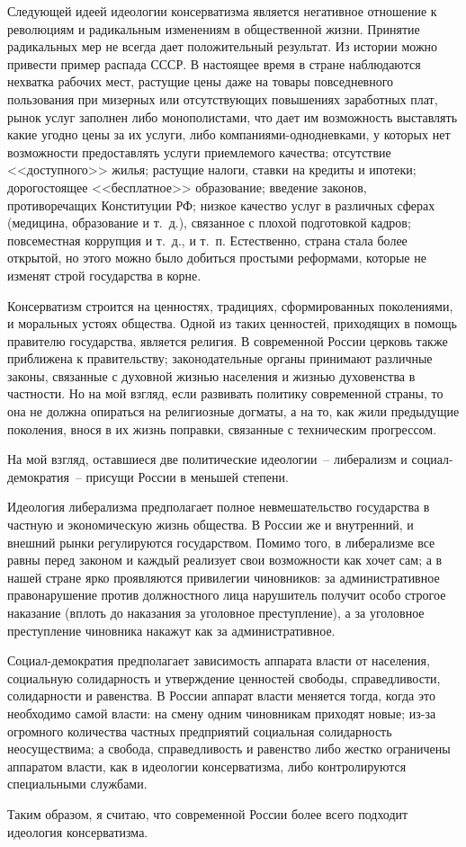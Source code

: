 \documentclass[pscyr]{hedreport}
\begin{document}
  Следующей идеей идеологии консерватизма является негативное отношение к
  революциям и радикальным изменениям в общественной жизни. Принятие радикальных
  мер не всегда дает положительный результат. Из истории можно привести пример
  распада СССР. В настоящее время в стране наблюдаются нехватка рабочих мест,
  растущие цены даже на товары повседневного пользования при мизерных или
  отсутствующих повышениях заработных плат, рынок услуг заполнен либо
  монополистами, что дает им возможность выставлять какие угодно цены за их
  услуги, либо компаниями-однодневками, у которых нет возможности предоставлять
  услуги приемлемого качества; отсутствие <<доступного>> жилья; растущие налоги,
  ставки на кредиты и ипотеки; дорогостоящее <<бесплатное>> образование;
  введение законов, противоречащих Конституции РФ; низкое качество услуг в
  различных сферах (медицина, образование и т.~д.), связанное с плохой
  подготовкой кадров; повсеместная коррупция и т.~д., и т.~п. Естественно,
  страна стала более открытой, но этого можно было добиться простыми реформами,
  которые не изменят строй государства в корне.

  Консерватизм строится на ценностях, традициях, сформированных поколениями, и
  моральных устоях общества. Одной из таких ценностей, приходящих в помощь
  правителю государства, является религия. В современной России церковь также
  приближена к правительству; законодательные органы принимают различные законы,
  связанные с духовной жизнью населения и жизнью духовенства в частности. Но на
  мой взгляд, если развивать политику современной страны, то она не должна
  опираться на религиозные догматы, а на то, как жили предыдущие поколения,
  внося в их жизнь поправки, связанные с техническим прогрессом.

  На мой взгляд, оставшиеся две политические идеологии~-- либерализм и
  социал-демократия~-- присущи России в меньшей степени.

  Идеология либерализма предполагает полное невмешательство государства в
  частную и экономическую жизнь общества. В России же и внутренний, и внешний
  рынки регулируются государством. Помимо того, в либерализме все равны перед
  законом и каждый реализует свои возможности как хочет сам; а в нашей стране
  ярко проявляются привилегии чиновников: за административное правонарушение
  против должностного лица нарушитель получит особо строгое наказание (вплоть
  до наказания за уголовное преступление), а за уголовное преступление чиновника
  накажут как за административное.

  Социал-демократия предполагает зависимость аппарата власти от населения,
  социальную солидарность и утверждение ценностей свободы, справедливости,
  солидарности и равенства. В России аппарат власти меняется тогда, когда это
  необходимо самой власти: на смену одним чиновникам приходят новые; из-за
  огромного количества частных предприятий социальная солидарность
  неосуществима; а свобода, справедливость и равенство либо жестко ограничены
  аппаратом власти, как в идеологии консерватизма, либо контролируются
  специальными службами.
  
  Таким образом, я считаю, что современной России более всего подходит идеология
  консерватизма.
\end{document}
